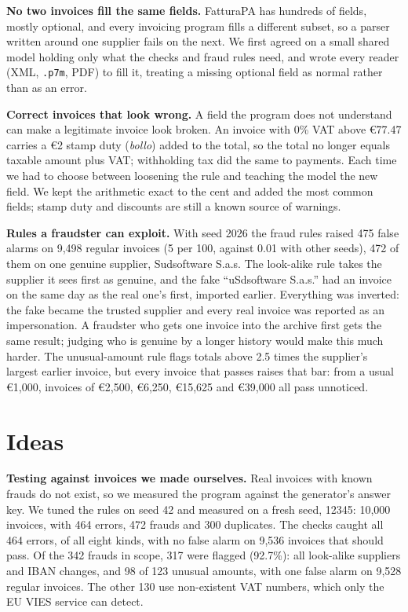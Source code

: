 \documentclass[11pt,a4paper]{article}
\begin{document}
\textbf{No two invoices fill the same fields.} FatturaPA has hundreds of fields, mostly optional,
and every invoicing program fills a different subset, so a parser written around one supplier
fails on the next. We first agreed on a small shared model holding only what the checks and
fraud rules need, and wrote every reader (XML, \texttt{.p7m}, PDF) to fill it, treating a
missing optional field as normal rather than as an error.

\textbf{Correct invoices that look wrong.} A field the program does not understand can make a
legitimate invoice look broken. An invoice with 0\% VAT above \euro{}77.47 carries a \euro{}2
stamp duty (\emph{bollo}) added to the total, so the total no longer equals taxable amount plus
VAT; withholding tax did the same to payments. Each time we had to choose between loosening the
rule and teaching the model the new field. We kept the arithmetic exact to the cent and added
the most common fields; stamp duty and discounts are still a known source of warnings.

\textbf{Rules a fraudster can exploit.} With seed 2026 the fraud rules raised 475 false alarms
on 9,498 regular invoices (5 per 100, against 0.01 with other seeds), 472 of them on one genuine
supplier, Sudsoftware S.a.s. The look-alike rule takes the supplier it sees first as genuine,
and the fake ``uSdsoftware S.a.s.'' had an invoice on the same day as the real one's first,
imported earlier. Everything was inverted: the fake became the trusted supplier and every real
invoice was reported as an impersonation. A fraudster who gets one invoice into the archive
first gets the same result; judging who is genuine by a longer history would make this much
harder. The unusual-amount rule flags totals above 2.5 times the supplier's largest earlier
invoice, but every invoice that passes raises that bar: from a usual \euro{}1,000, invoices of
\euro{}2,500, \euro{}6,250, \euro{}15,625 and \euro{}39,000 all pass unnoticed.

\section*{Ideas}

\textbf{Testing against invoices we made ourselves.} Real invoices with known frauds do not
exist, so we measured the program against the generator's answer key. We tuned the rules on seed 42 and
measured on a fresh seed, 12345: 10,000 invoices, with 464 errors, 472 frauds and 300
duplicates. The checks caught all 464 errors, of all eight kinds, with no false alarm on 9,536
invoices that should pass. Of the 342 frauds in scope, 317 were flagged (92.7\%): all look-alike
suppliers and IBAN changes, and 98 of 123 unusual amounts, with one false alarm on 9,528 regular
invoices. The other 130 use non-existent VAT numbers, which only the EU VIES service can detect.
\end{document}
